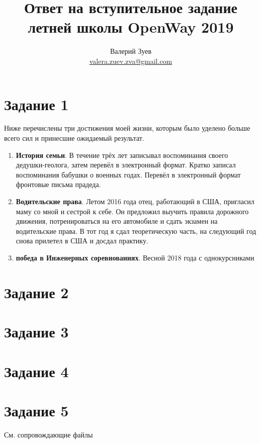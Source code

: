 \documentclass[a4paper,12pt]{article} %
\begin{document}
\author{Валерий Зуев \\ \href{mailto:valera.zuev.zva@gmail.com}{valera.zuev.zva@gmail.com}}
\title{Ответ на вступительное задание летней школы OpenWay 2019}
\maketitle

\section{Задание 1}
Ниже перечислены три достижения моей жизни, которым было уделено больше всего сил и принесшие ожидаемый результат.
\begin{enumerate}
	\item \textbf{История семьи}. В течение трёх лет записывал воспоминания своего дедушки-геолога, затем перевёл в электронный формат. Кратко записал воспоминания бабушки о военных годах. Перевёл в электронный формат фронтовые письма прадеда.
	\item \textbf{Водительские права}. Летом 2016 года отец, работающий в США, пригласил маму со мной и сестрой к себе. Он предложил выучить правила дорожного движения, потренироваться на его автомобиле и сдать экзамен на водительские права. В тот год я сдал теоретическую часть, на следующий год снова прилетел в США и досдал практику.
	\item \textbf{победа в Инженерных соревнованиях}. Весной 2018 года с однокурсниками
\end{enumerate}
\section{Задание 2}

\section{Задание 3}



\section{Задание 4}

\section{Задание 5}
См. сопровождающие файлы


	
\end{document}
